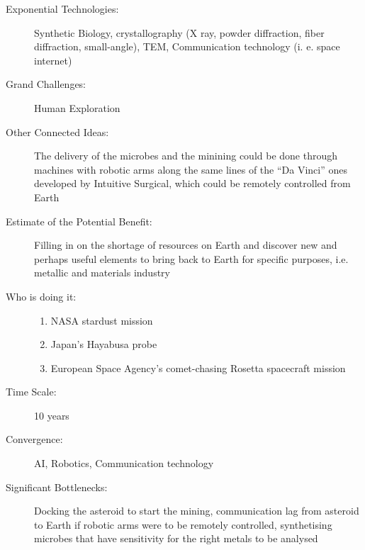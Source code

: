 \begin{description}
\item[Exponential Technologies:] Synthetic Biology, \Gls{crystallography} (X ray, powder diffraction, fiber diffraction, small-angle), \gls{TEM}, Communication technology (i. e. space internet)
\item[Grand Challenges:] Human Exploration
\item[Other Connected Ideas:] The delivery of the microbes and the minining could be done through machines with robotic arms along the same lines of the ``Da Vinci'' ones developed by Intuitive Surgical, which could be remotely controlled from Earth
\item[Estimate of the Potential Benefit:] Filling in on the shortage of resources on Earth and discover new and perhaps useful elements to bring back to Earth for specific purposes, i.e. metallic and materials industry
\item[Who is doing it:]
\hfill\begin{enumerate}
\item NASA stardust mission
\item Japan's Hayabusa probe
\item European Space Agency's comet-chasing Rosetta spacecraft mission
\end{enumerate}
\item[Time Scale:] 10 years
\item[Convergence:] AI, Robotics, Communication technology
\item[Significant Bottlenecks:] Docking the asteroid to start the mining, communication lag from asteroid to Earth if robotic arms were to be remotely controlled, synthetising microbes that have sensitivity for the right metals to be analysed
 \end{description}
 
